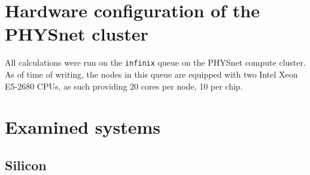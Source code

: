 \documentclass[main.tex]{subfiles}
\begin{document}

\section{Hardware configuration of the PHYSnet cluster}\label{sec:hardware_physnet}

All calculations were run on the \texttt{infinix} queue on the PHYSnet compute cluster. 
As of time of writing, the nodes in this queue are equipped with two Intel Xeon E5-2680 CPUs, as such providing 20 cores per node, 10 per chip.


\section{Examined systems}

\subsection{Silicon}

\subsection{\TaS}
\end{document}
